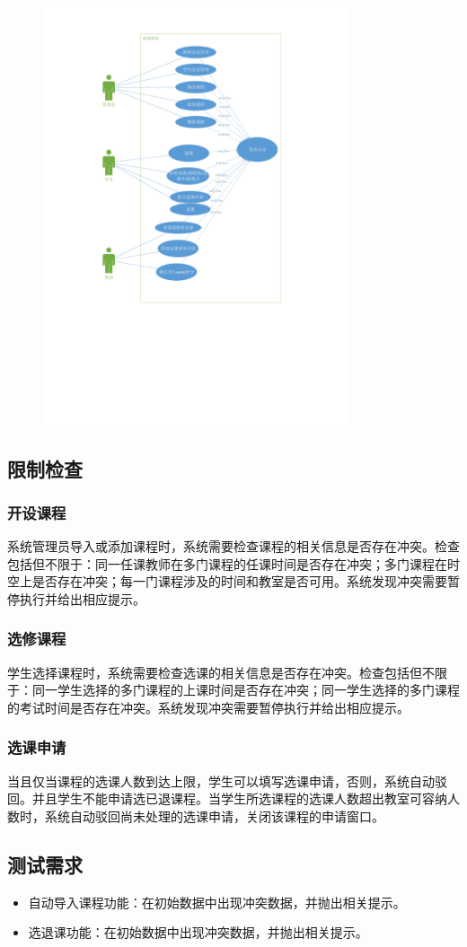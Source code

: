 \begin{figure}[h]
    \centering
    \includegraphics[width=0.8\textwidth]{assets/courseTakingusercase.pdf}
    \end{figure}

\subsection{限制检查}
\subsubsection{开设课程}
系统管理员导入或添加课程时，系统需要检查课程的相关信息是否存在冲突。检查包括但不限于：同一任课教师在多门课程的任课时间是否存在冲突；多门课程在时空上是否存在冲突；每一门课程涉及的时间和教室是否可用。系统发现冲突需要暂停执行并给出相应提示。
\subsubsection{选修课程}
学生选择课程时，系统需要检查选课的相关信息是否存在冲突。检查包括但不限于：同一学生选择的多门课程的上课时间是否存在冲突；同一学生选择的多门课程的考试时间是否存在冲突。系统发现冲突需要暂停执行并给出相应提示。
\subsubsection{选课申请}
当且仅当课程的选课人数到达上限，学生可以填写选课申请，否则，系统自动驳回。并且学生不能申请选已退课程。当学生所选课程的选课人数超出教室可容纳人数时，系统自动驳回尚未处理的选课申请，关闭该课程的申请窗口。
\subsection{测试需求}

\begin{itemize}
    \item 自动导入课程功能：在初始数据中出现冲突数据，并抛出相关提示。
    \item 选退课功能：在初始数据中出现冲突数据，并抛出相关提示。
\end{itemize}



